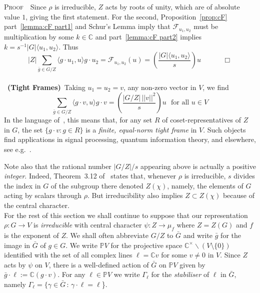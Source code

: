\documentclass[12pt]{article}
\newcommand{\addwords}[1]{\ \ \ \mbox{#1}}
\newcommand{\bbC}{\ensuremath{\mathbb{C}}}\newcommand{\bbCp}{\ensuremath{\mathbb{C}_p}}
\newcommand{\bbP}{\ensuremath{\mathbb{P}}}
\newcommand{\bPf}{\noindent \textsc{Proof\ }}
\newcommand{\cF}{\ensuremath{\mathcal{F}}}
\newcommand{\ie}{{\em i.e.}}
\newcommand{\inv}{^{-1}}%
\renewcommand{\rem}{\refstepcounter{rem}\noindent{\sc Remark \therem}}
\renewcommand{\therem}{\thesection.\arabic{rem}}
\newcommand{\barG}{\ensuremath{\bar{G}}}
\begin{document}
 \bPf\ Since $\rho$ is irreducible, $Z$ acts by roots of unity, which are of absolute value $1$, giving the first statement. For the second, Proposition~\ref{prop:cF} part~\ref{lemma:cF part1} and Schur's Lemma imply that $\cF_{u_1,u_2}$ must be multiplication by some $k\in \bbC$ and part~\ref{lemma:cF part2} implies $k=s\inv|G|\langle  u_1,u_2\rangle$. Thus
 $$
 |Z|\sum_{\bar{g}\in G/Z} \langle  g\cdot u_1, u\rangle g\cdot u_2=
 \cF_{u_1,u_2}(u)=\left (\frac{|G|\langle  u_1,u_2\rangle}{s}\right) u
 \ \ \ \ \ \ \ \ \ \ \ \ \ \ \Box 
 $$\smallskip\\
 \rem\ \textbf{(Tight Frames)}\label{rem:tight frames}\
Taking $u_1=u_2=v$, any non-zero vector in $V$, we find 
$$
\sum_{\bar{g}\in G/Z} \langle  g\cdot v, u\rangle g\cdot v=\left (\frac{|G/Z|\,|| v||^2}{s}\right) u\addwords{for all $u\in V$}
$$
In the language of~\cite{Waldron's book}, this means that, for any set $R$ of coset-representatives of $Z$ in $G$, the set $\{g\cdot v:g\in R\}$ is a  \textit{finite, equal-norm tight frame} in $V$. Such objects find applications in signal processing, quantum information theory, and elsewhere, see e.g.~\cite{Waldron's book}. 

 Note also that the rational number $|G/Z|/s$ appearing above is actually a positive \textit{integer}. Indeed, Theorem~3.12 of~\cite{Isaacs} states that, whenever $\rho$ is irreducible, $s$ divides the index in $G$ of the 
subgroup there denoted $Z(\chi)$, namely, the elements of $G$ acting by scalars through $\rho$. But irreducibility also implies  $Z\subset Z(\chi)$ because of the central character.\bigskip\\
%   
For the rest of this section we shall continue to suppose that our representation $\rho:G\rightarrow V$ is \textit{irreducible} with central character $\psi:Z\rightarrow \mu_f$ where $Z=Z(G)$ and $f$ is the exponent of $Z$. We shall often abbreviate $G/Z$ to $\barG$ and write $\bar{g}$ for the image in $\barG$ of $g\in G$. 
We write $\bbP V$ for the projective space $\bbC^\times\backslash(V\setminus\{0\})$ identified with the set of all complex lines $\ell=\bbC v$ for some $v\neq 0$ in $V$.
Since $Z$ acts by $\psi$ on $V$, there is a well-defined action of $\barG$ on $\bbP V$ given  by $\bar{g}\cdot \ell:=\bbC (g\cdot v)$. For any $\ell\in\bbP V$ we write $\Gamma_\ell$ for the \textit{stabiliser} of $\ell$ in $\barG$, namely $\Gamma_\ell=\{\gamma\in\barG\,:\, \gamma\cdot\ell=\ell$\}. 
\end{document}
